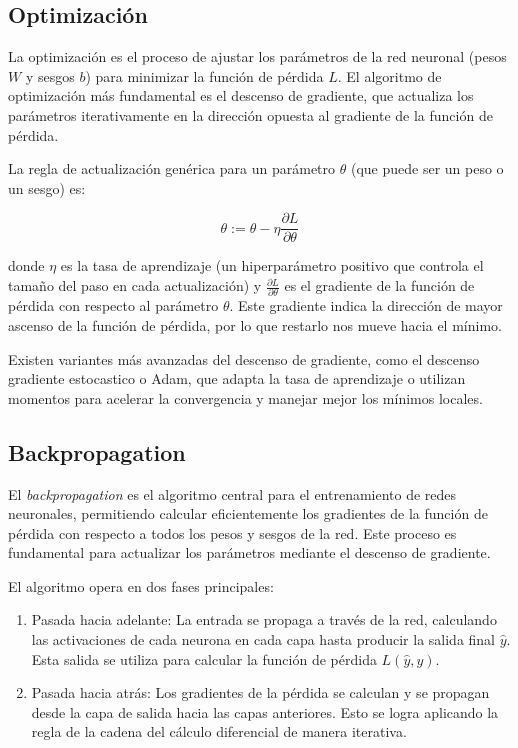 \subsection{Optimización}
La optimización es el proceso de ajustar los parámetros de la red neuronal (pesos $W$ y sesgos $b$) para minimizar la función de pérdida $L$. El algoritmo de optimización más fundamental es el descenso de gradiente, que actualiza los parámetros iterativamente en la dirección opuesta al gradiente de la función de pérdida.

La regla de actualización genérica para un parámetro $\theta$ (que puede ser un peso o un sesgo) es:

\begin{equation}
    \theta := \theta - \eta \frac{\partial L}{\partial \theta}
\end{equation}

donde $\eta$ es la tasa de aprendizaje (un hiperparámetro positivo que controla el tamaño del paso en cada actualización) y $\frac{\partial L}{\partial \theta}$ es el gradiente de la función de pérdida con respecto al parámetro $\theta$. Este gradiente indica la dirección de mayor ascenso de la función de pérdida, por lo que restarlo nos mueve hacia el mínimo.

Existen variantes más avanzadas del descenso de gradiente, como el descenso gradiente estocastico o Adam, que adapta la tasa de aprendizaje o utilizan momentos para acelerar la convergencia y manejar mejor los mínimos locales.

\subsection{Backpropagation}
El \textit{backpropagation} es el algoritmo central para el entrenamiento de redes neuronales, permitiendo calcular eficientemente los gradientes de la función de pérdida con respecto a todos los pesos y sesgos de la red. Este proceso es fundamental para actualizar los parámetros mediante el descenso de gradiente.

El algoritmo opera en dos fases principales:
\begin{enumerate}
    \item Pasada hacia adelante: La entrada se propaga a través de la red, calculando las activaciones de cada neurona en cada capa hasta producir la salida final $\hat{y}$. Esta salida se utiliza para calcular la función de pérdida $L(\hat{y}, y)$.
    \item Pasada hacia atrás: Los gradientes de la pérdida se calculan y se propagan desde la capa de salida hacia las capas anteriores. Esto se logra aplicando la regla de la cadena del cálculo diferencial de manera iterativa.
\end{enumerate}

